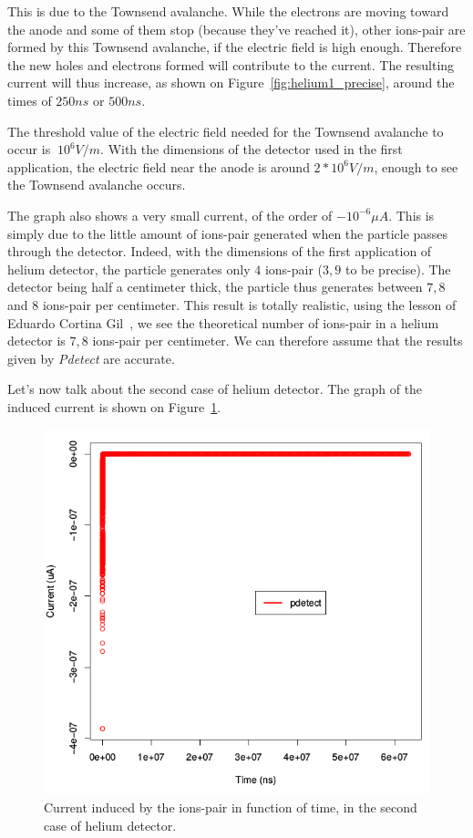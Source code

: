 \documentclass[11pt]{article}
\begin{document}
			This is due to the Townsend avalanche. While the electrons are moving toward the anode and some of them stop
			(because they've reached it), other ions-pair are formed by this Townsend avalanche, if the electric field is
			high enough. Therefore the new holes and electrons formed will contribute to the current. The resulting current
			will thus increase, as shown on Figure~\ref{fig:helium1_precise}, around the times of $250ns$ or $500ns$.

			The threshold value of the electric field needed for the Townsend avalanche to occur is $~10^6V/m$. With the
			dimensions of the detector used in the first application, the electric field near the anode is around
			$2*10^6V/m$, enough to see the Townsend avalanche occurs.

			The graph also shows a very small current, of the order of $-10^{-6}\mu A$. This is simply due to the little
			amount of ions-pair generated when the particle passes through the detector. Indeed, with the dimensions of the
			first application of helium detector, the particle generates only $4$ ions-pair ($3,9$ to be precise). The detector
			being half a centimeter thick, the particle thus generates between $7,8$ and $8$ ions-pair per centimeter.
			This result is totally realistic, using the lesson of Eduardo Cortina Gil~\cite{lphy2236}, we see the theoretical
			number of ions-pair in a helium detector is $7,8$ ions-pair per centimeter. We can therefore assume that the
			results given by \textit{Pdetect} are accurate.

			Let's now talk about the second case of helium detector. The graph of the induced current is shown on
			Figure~\ref{fig:helium2_unprecise}.

			\begin{figure}[H]
			  \center
			  \includegraphics[scale=0.4]{images/applications/helium2_unprecise.png}
			  \caption{Current induced by the ions-pair in function of time, in the second case of helium detector.}
			  \label{fig:helium2_unprecise}
			\end{figure}
\end{document}
